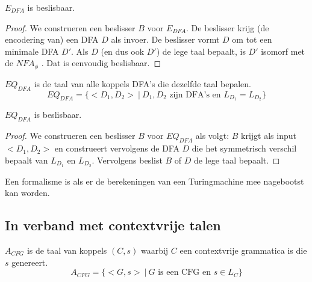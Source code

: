 \documentclass[main.tex]{subfiles}
\begin{document}
\begin{st}
  \label{st:e-dfa-besl}
  $E_{DFA}$ is beslisbaar.

  \begin{proof}
    We construeren een beslisser $B$ voor $E_{DFA}$.
    De beslisser krijg (de encodering van) een DFA $D$ als invoer.
    De beslisser vormt $D$ om tot een minimale DFA $D'$.
    Als $D$ (en dus ook $D'$) de lege taal bepaalt, is $D'$ isomorf met de $NFA_{\phi}$ .
    Dat is eenvoudig beslisbaar.
\waarom
  \end{proof}
\end{st}

\begin{de}
  \label{de:eq-dfa}
  $EQ_{DFA}$ is de taal van alle koppels DFA's die dezelfde taal bepalen.
  \[ EQ_{DFA} = \{ <D_{1},D_{2}> \ |\ D_{1},D_{2} \text{ zijn DFA's en } L_{D_{1}} = L_{D_{2}} \} \]  
\end{de}

\begin{st}
  \label{st:eq-dfa-besl}
  $EQ_{DFA}$ is beslisbaar.

  \begin{proof}
    We construeren een beslisser $B$ voor $EQ_{DFA}$ als volgt:
    $B$ krijgt als input $<D_{1},D_{2}>$ en construeert vervolgens de DFA $D$ die het symmetrisch verschil bepaalt van $L_{D_{1}}$ en $L_{D_{2}}$.
    Vervolgens beslist $B$ of $D$ de lege taal bepaalt.
  \end{proof}
\end{st}

\begin{de}
  Een formalisme is  als er de berekeningen van een Turingmachine mee nagebootst kan worden.
\end{de}
\subsection{In verband met contextvrije talen}
\label{sec:verb-met-cont}

\begin{de}
  \label{de:a-cfg}
  $A_{CFG}$ is de taal van koppels $(C,s)$ waarbij $C$ een contextvrije grammatica is die $s$ genereert.
  \[ A_{CFG} = \{ <G,s> \ |\ G \text{ is een CFG en } s \in L_{C} \} \]
\end{de}
\end{document}

